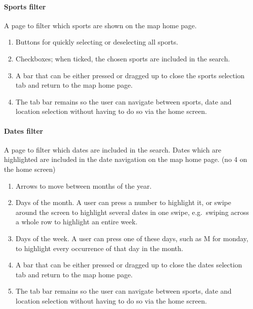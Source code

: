 \paragraph{Sports filter}

A page to filter which sports are shown on the map home page.

\begin{enumerate}
	\item Buttons for quickly selecting or deselecting all sports.
	\item Checkboxes; when ticked, the chosen sports are included in the
		search.
	\item A bar that can be either pressed or dragged up to close the sports
		selection tab and return to the map home page.
	\item The tab bar remains so the user can navigate between sports, date and
		location selection without having to do so via the home screen.
\end{enumerate}

\paragraph{Dates filter}

A page to filter which dates are included in the search. Dates which are
highlighted are included in the date navigation on the map home page. (no 4 on
the home screen)

\begin{enumerate}
	\item Arrows to move between months of the year.
	\item Days of the month. A user can press a number to highlight it, or
		swipe around the screen to highlight several dates in one swipe, e.g.\
		swiping across a whole row to highlight an entire week.
	\item Days of the week. A user can press one of these days, such as M for
		monday, to highlight every occurrence of that day in the month.
	\item A bar that can be either pressed or dragged up to close the dates
		selection tab and return to the map home page.
	\item The tab bar remains so the user can navigate between sports, date and
		location selection without having to do so via the home screen.
\end{enumerate}

